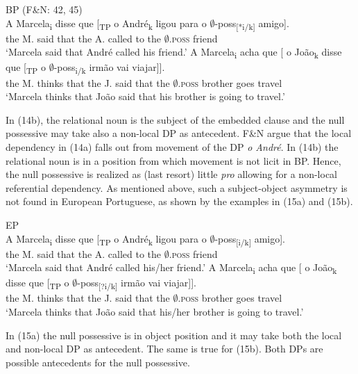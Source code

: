 \documentclass[output=paper]{langsci/langscibook}
\begin{document}
\ea%
    BP (F\&N: 42, 45)\label{ex:wein:14}\\
    \ea
    \gll A Marcela\textsubscript{i} disse que [\textsubscript{TP} o André\textsubscript{k} ligou para o $\emptyset$-poss\textsubscript{[}\textsubscript{*i/k]} amigo].\\
         the M. said that {} the A. called to the $\emptyset$\textsc{.poss} friend\\
    \glt ‘Marcela said that André called his friend.’
    \ex  
    \gll A Marcela\textsubscript{i} acha que [ o João\textsubscript{k} disse que [\textsubscript{TP} o $\emptyset$-poss\textsubscript{i/k} irmão vai viajar]].\\
         the M. thinks that {} the J. said that {} the $\emptyset$\textsc{.poss} brother goes travel\\
    \glt ‘Marcela thinks that João said that his brother is going to travel.’
    \z
\z

In (14b), the relational noun is the subject of the embedded clause and the null possessive may take also a non-local DP as antecedent. F\&N argue that the local dependency in (14a) falls out from movement of the DP \textit{o André}. In (14b) the relational noun is in a position from which movement is not licit in BP. Hence, the null possessive is realized as (last resort) little \textit{pro} allowing for a non-local referential dependency. As mentioned above, such a subject-object asymmetry is not found in European Portuguese, as shown by the examples in (15a) and (15b).

\ea%
    EP\label{ex:wein:15}\\
    \ea
    \gll A Marcela\textsubscript{i} disse que [\textsubscript{TP} o André\textsubscript{k} ligou para o $\emptyset$-poss\textsubscript{[}\textsubscript{i/k]} amigo].\\
         the M. said that {} the A. called to the $\emptyset$\textsc{.poss} friend\\
    \glt ‘Marcela said that André called his/her friend.’
    \ex  
    \gll A Marcela\textsubscript{i} acha que [ o João\textsubscript{k} disse que [\textsubscript{TP} o $\emptyset$-poss\textsubscript{[}\textsubscript{?i/k]} irmão vai viajar]].\\
         the M. thinks that {} the J. said that {} the $\emptyset$\textsc{.poss} brother goes travel\\
    \glt ‘Marcela thinks that João said that his/her brother is going to travel.’
    \z
\z

In (15a) the null possessive is in object position and it may take both the local and non-local DP as antecedent. The same is true for (15b). Both DPs are possible antecedents for the null possessive.
\end{document}
